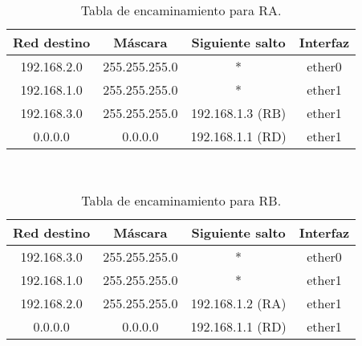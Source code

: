 \begin{ejercicio}
\begin{table}[H]
    \begin{tabular}{|c|c|c|c|}
        \hline
        Red destino & Máscara & Siguiente salto & Interfaz \\
        \hline
        192.168.2.0 & 255.255.255.0 & * & ether0 \\
        \hline
        192.168.1.0 & 255.255.255.0 & * & ether1 \\
        \hline
        192.168.3.0 & 255.255.255.0 & 192.168.1.3 (RB) & ether1 \\
        \hline
        0.0.0.0 & 0.0.0.0 & 192.168.1.1 (RD) & ether1 \\
        \hline
    \end{tabular}\\
    \caption{Tabla de encaminamiento para RA.}
    \end{table}

    \begin{table}[H]
        \centering
        \begin{tabular}{|c|c|c|c|}
            \hline
            Red destino & Máscara & Siguiente salto & Interfaz \\
            \hline
            192.168.3.0 & 255.255.255.0 & * & ether0 \\
            \hline
            192.168.1.0 & 255.255.255.0 & * & ether1 \\
            \hline
            192.168.2.0 & 255.255.255.0 & 192.168.1.2 (RA) & ether1 \\
            \hline
            0.0.0.0 & 0.0.0.0 & 192.168.1.1 (RD) & ether1 \\
            \hline
        \end{tabular}\\
        \caption{Tabla de encaminamiento para RB.}
        \end{table}


\end{ejercicio}

